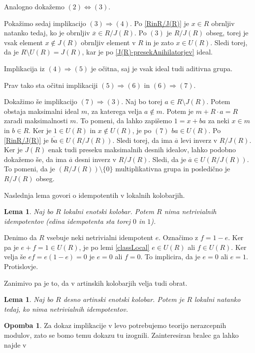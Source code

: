 \documentclass[a4paper, 12pt]{amsart}
\theoremstyle{definition} %
\newtheorem{opomba}[definicija]{Opomba}
\theoremstyle{plain} %
\newtheorem{lema}[definicija]{Lema}
\begin{document}
Analogno dokažemo $(2) \Leftrightarrow (3)$.

Pokažimo sedaj implikacijo $(3) \Rightarrow (4)$. Po \ref{RinR/J(R)} je $x\in R$ obrnljiv natanko tedaj, ko je obrnljiv $\overline{x}\in R/J(R)$. Po $(3)$  je $R/J(R)$ obseg, torej je vsak element $x\notin J(R)$ obrnljiv element v $R$ in je zato $x\in U(R)$. Sledi torej, da je $R\setminus U(R) = J(R)$, kar je po \ref{J(R)-presekAnihilatorjev} ideal.

Implikacija iz $(4)\Rightarrow (5)$ je očitna, saj je vsak ideal tudi aditivna grupa.

Prav tako sta očitni implikaciji $(5) \Rightarrow (6) $ in $(6) \Rightarrow (7)$. 

Dokažimo še implikacijo $(7) \Rightarrow (3)$. Naj bo torej $a\in R\setminus J(R)$. Potem obstaja maksimalni ideal $m$, za katerega velja $a\notin m$. Potem je $m+ R\cdot a = R$ zaradi maksimalnosti $m$. To pomeni, da lahko zapišemo $1 = x+ba$ za neki $x\in m$ in $b\in R$. Ker je $1\in U(R)$ in $x\notin U(R)$, je po $(7)$ $ba \in U(R)$. Po \ref{RinR/J(R)} je $\overline{ba} \in U(R/J(R))$. Sledi torej, da ima $\overline{a}$ levi inverz v $R/J(R)$. Ker je $J(R)$ enak tudi preseku maksimalnih desnih idealov, lahko podobno dokažemo še, da ima $\overline{a}$ desni inverz v $R/J(R)$. Sledi, da je $\overline{a}\in U(R/J(R))$. To pomeni, da je $(R/J(R)) \setminus \{0\}$ multiplikativna grupa in posledično je $R/J(R) $ obseg.
\endproof

Naslednja lema govori o idempotentih v lokalnih kolobarjih.
\begin{lema}
Naj bo $R$ lokalni enotski kolobar. Potem $R$ nima netrivialnih idempotentov (edina idempotenta sta torej $0$ in $1$).
\end{lema}

\proof
Denimo da $R$ vsebuje neki netrivialni idempotent $e$. Označimo z $f=1-e$. Ker pa je $e+f = 1\in U(R)$, je po lemi \ref{classLocal} $e\in U(R)$ ali $f\in U(R)$. Ker velja še $ef = e(1-e) = 0$ je $e=0$ ali $f=0$. To implicira, da je $e=0$ ali $e=1$. Protislovje. 
\endproof

Zanimivo pa je to, da v artinskih kolobarjih velja tudi obrat.

\begin{lema}
\label{localIffNoIdemp}
Naj bo $R$ desno artinski enotski kolobar. Potem je $R$ lokalni natanko tedaj, ko nima netrivialnih idempotentov.
\end{lema}

\begin{opomba}
Za dokaz implikacije v levo potrebujemo teorijo nerazcepnih modulov, zato se bomo temu dokazu tu izognili. Zainteresiran bralec ga lahko najde v \cite[Posledica 19.19]{Lam}
\end{opomba}
\end{document}
